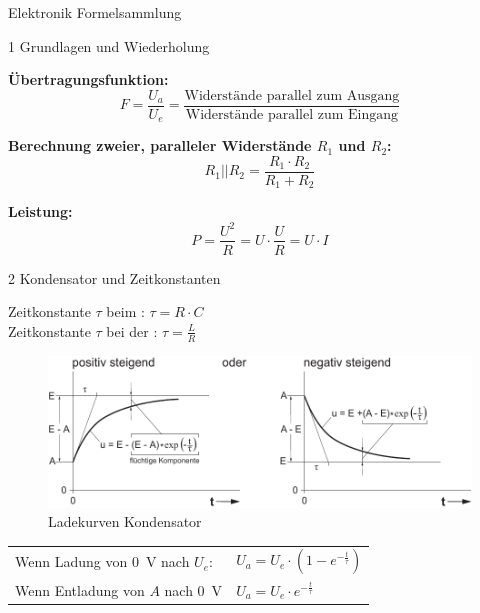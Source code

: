 \documentclass[a5paper, 12pt]{scrartcl}
\begin{document}
\begin{center}
  \huge Elektronik Formelsammlung
\end{center}

{\Large 1 Grundlagen und Wiederholung}

\vspace{.5cm}

\begin{minipage}{.45\textwidth}
\textbf{Übertragungsfunktion:} \[F = \frac{U_a}{U_e} = \frac{\text{Widerstände parallel zum Ausgang}}{\text{Widerstände parallel zum Eingang}}\]

\textbf{Berechnung zweier, paralleler Widerstände \(R_1\) und \(R_2\):} \[R_1 || R_2 = \frac{R_1 \cdot R_2}{R_1 + R_2}\]

\textbf{Leistung:} \[P = \frac{U^2}{R} = U \cdot \frac{U}{R} = U \cdot I\]
\end{minipage}\hfill\vline\hfill%
\begin{minipage}{.45\textwidth}
  \lipsum[4]
\end{minipage}

\vspace{.5cm}
{\Large 2 Kondensator und Zeitkonstanten}
\vspace{.5cm}

Zeitkonstante \(\tau\) beim : \dotfill \(\tau = R \cdot C\)\\
Zeitkonstante \(\tau\) bei der : \dotfill \(\tau = \frac{L}{R}\)\\

\begin{figure}[H]
  \centering
  \includegraphics[width=.7\textwidth]{LadekurveKondensator}
  \caption{Ladekurven Kondensator }
\end{figure}

\begin{center}
  \begin{tabular}{ll}
    \toprule
    Wenn Ladung von \SI{0}{\volt} nach \(U_e\): & \(U_a = U_e \cdot (1 - e^{-\frac{t}{\tau}})\)\\
    Wenn Entladung von \(A\) nach \SI{0}{\volt} & \(U_a = U_e \cdot e^{-\frac{t}{\tau}}\)\\
    \bottomrule
  \end{tabular}
\end{center}
\end{document}

